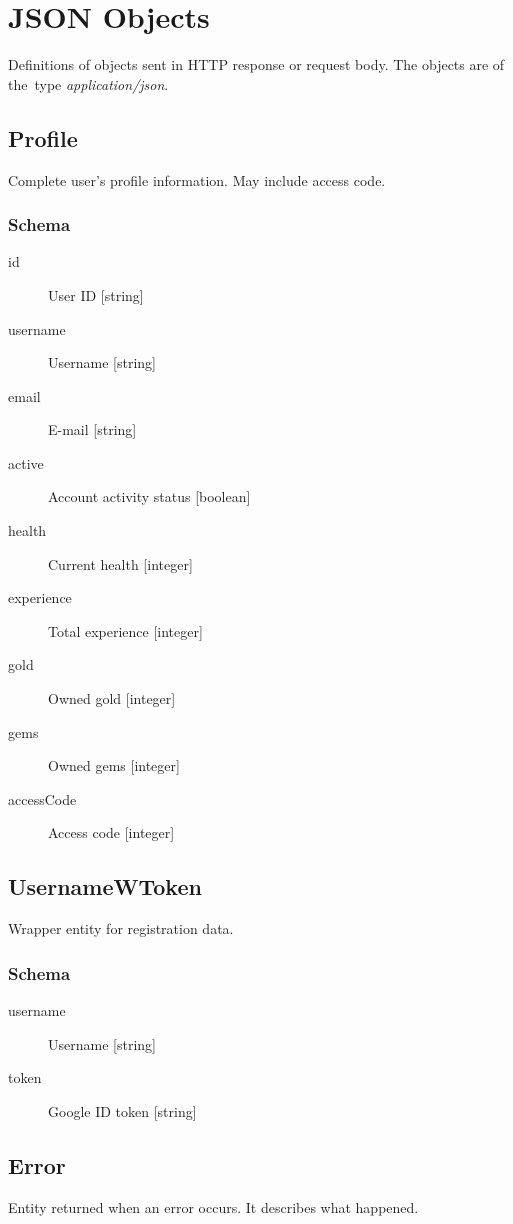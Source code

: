 \section{JSON Objects}
Definitions of objects sent in HTTP response or request body. The objects are of the~type \textit{application/json}.
	\subsection{Profile}
		\label{json:profile}
		Complete user's profile information. May include access code.
		\subsubsection{Schema}	
			\begin{description}
				\item[id] User ID [string]
				\item[username] Username [string]
				\item[email] E-mail [string]
				\item[active] Account activity status [boolean]
				\item[health] Current health [integer]
				\item[experience] Total experience [integer]
				\item[gold] Owned gold [integer]
				\item[gems] Owned gems [integer]
				\item[accessCode] Access code [integer]
			\end{description}

	\subsection{UsernameWToken}
		\label{json:usernamewtoken}
		Wrapper entity for registration data.
		\subsubsection{Schema}
			\begin{description}
				\item[username] Username [string]
				\item[token] Google ID token [string]
			\end{description}

	\subsection{Error}
		\label{json:error}
		Entity returned when an error occurs. It describes what happened.
